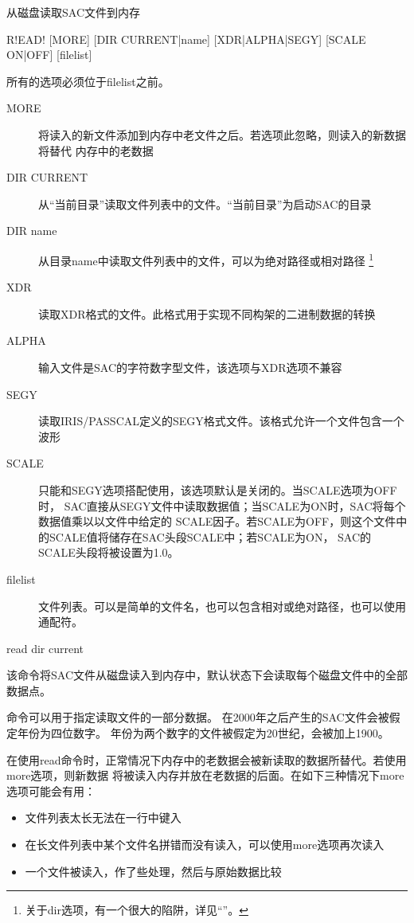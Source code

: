 \label{cmd:read}

从磁盘读取SAC文件到内存

\begin{SACSTX}
R!EAD! [MORE] [DIR CURRENT|name] [XDR|ALPHA|SEGY]
    [SCALE ON|OFF] [filelist]
\end{SACSTX}
所有的选项必须位于filelist之前。

\begin{description}
\item [MORE] 将读入的新文件添加到内存中老文件之后。若选项此忽略，则读入的新数据将替代
    内存中的老数据
\item [DIR CURRENT] 从``当前目录''读取文件列表中的文件。``当前目录''为启动SAC的目录
\item [DIR name] 从目录name中读取文件列表中的文件，可以为绝对路径或相对路径
    \footnote{关于dir选项，有一个很大的陷阱，详见``''。}
\item [XDR] 读取XDR格式的文件。此格式用于实现不同构架的二进制数据的转换
\item [ALPHA] 输入文件是SAC的字符数字型文件，该选项与XDR选项不兼容
\item [SEGY] 读取IRIS/PASSCAL定义的SEGY格式文件。该格式允许一个文件包含一个波形
\item [SCALE] 只能和SEGY选项搭配使用，该选项默认是关闭的。当SCALE选项为OFF时，
    SAC直接从SEGY文件中读取数据值；当SCALE为ON时，SAC将每个数据值乘以以文件中给定的
    SCALE因子。若SCALE为OFF，则这个文件中的SCALE值将储存在SAC头段SCALE中；若SCALE为ON，
    SAC的SCALE头段将被设置为1.0。
\item [filelist] 文件列表。可以是简单的文件名，也可以包含相对或绝对路径，也可以使用
    通配符。
\end{description}

\begin{SACDFT}
read dir current
\end{SACDFT}

该命令将SAC文件从磁盘读入到内存中，默认状态下会读取每个磁盘文件中的全部数据点。

命令可以用于指定读取文件的一部分数据。
在2000年之后产生的SAC文件会被假定年份为四位数字。
年份为两个数字的文件被假定为20世纪，会被加上1900。

在使用read命令时，正常情况下内存中的老数据会被新读取的数据所替代。若使用more选项，则新数据
将被读入内存并放在老数据的后面。在如下三种情况下more选项可能会有用：
\begin{itemize}
\item 文件列表太长无法在一行中键入
\item 在长文件列表中某个文件名拼错而没有读入，可以使用more选项再次读入
\item 一个文件被读入，作了些处理，然后与原始数据比较
\end{itemize}

